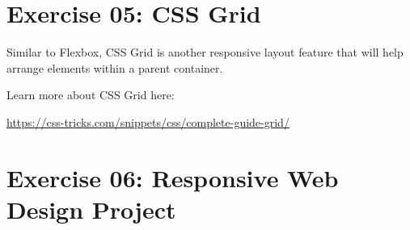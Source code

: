 \documentclass{42-en}
\begin{document}
\chapter{Exercise 05: CSS Grid}

\exnumber{\exercicenumber}

\makeheaderfiles

Similar to Flexbox, CSS Grid is another responsive layout feature that will help arrange elements within a parent container.\par
\vspace{.2in}
Learn more about CSS Grid here: \par
\url{https://css-tricks.com/snippets/css/complete-guide-grid/}


\chapter{Exercise 06: Responsive Web Design Project}

\exnumber{\exercicenumber}

\makeheaderfiles
\end{document}
